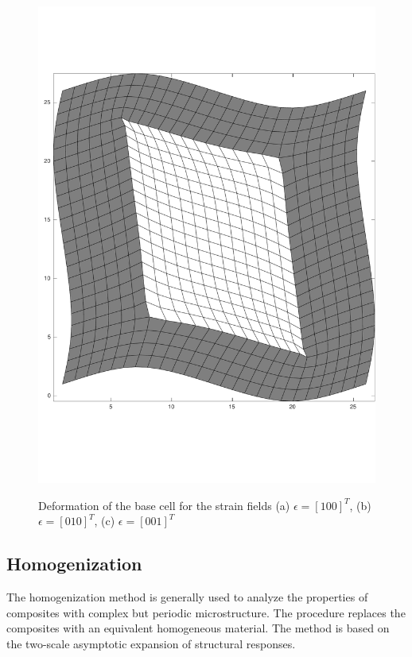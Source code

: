 \documentclass[10pt]{article}
\begin{document}
\begin{figure}[H]
\begin{center}
{		\includegraphics[trim=0cm 4cm 0cm 6cm,scale=.22]{./Plots/pbc/3}
     }
	\label{fig:pbc1}
	\caption{Deformation of the base cell for the strain fields (a) $\epsilon = [1 0 0]^T$, (b) $\epsilon = [0 1 0]^T$, (c) $\epsilon = [0 0 1]^T$}
\end{center}
\end{figure}

\subsection{Homogenization}
The homogenization method is generally used to analyze the properties of composites with complex but periodic microstructure. The procedure replaces the composites with an equivalent homogeneous material. 
The method is based on the two-scale asymptotic expansion of structural responses.
\end{document}
